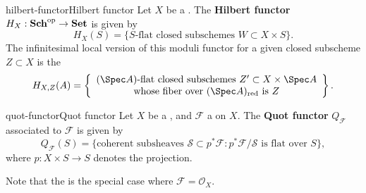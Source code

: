 \begin{topic}{hilbert-functor}{Hilbert functor}
    Let $X$ be a . The \textbf{Hilbert functor} $H_X : \textbf{Sch}^\textup{op} \to \textbf{Set}$ is given by
    \[ H_X(S) = \{ \text{$S$-flat closed subschemes $W \subset X \times S$} \} . \]
    The infinitesimal local version of this moduli functor for a given closed subscheme $Z \subset X$ is the 
    \[ H_{X, Z}(A) = \left\{ \begin{array}{cc} \text{$(\Spec A)$-flat closed subschemes $Z' \subset X \times \Spec A$} \\ \text{whose fiber over $(\Spec A)_\textup{red}$ is $Z$} \end{array} \right\} . \]
\end{topic}

\begin{topic}{quot-functor}{Quot functor}
    Let $X$ be a , and $\mathcal{F}$ a  on $X$. The \textbf{Quot functor} $Q_\mathcal{F}$ associated to $\mathcal{F}$ is given by
    \[ Q_\mathcal{F}(S) = \{ \text{coherent subsheaves } \mathcal{S} \subset p^* \mathcal{F} : p^* \mathcal{F} / \mathcal{S} \text{ is flat over } S \} , \]
    where $p : X \times S \to S$ denotes the projection.
    
    Note that the  is the special case where $\mathcal{F} = \mathcal{O}_X$.
\end{topic}
